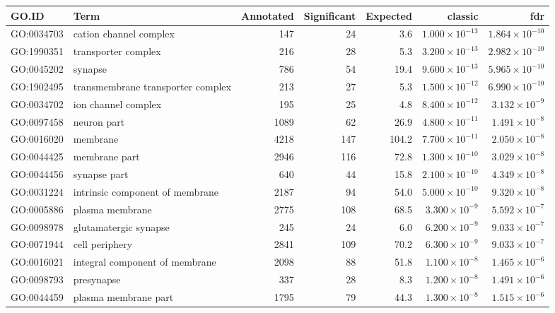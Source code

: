 \begin{table}[ht]
\centering
\begin{tabular}{llrrrrr}
  \hline
GO.ID & Term & Annotated & Significant & Expected & classic & fdr \\ 
  \hline
GO:0034703 & cation channel complex & 147 & 24 & 3.6 & $1.000 \times 10^{-13}$ & $1.864 \times 10^{-10}$ \\ 
  GO:1990351 & transporter complex & 216 & 28 & 5.3 & $3.200 \times 10^{-13}$ & $2.982 \times 10^{-10}$ \\ 
  GO:0045202 & synapse & 786 & 54 & 19.4 & $9.600 \times 10^{-13}$ & $5.965 \times 10^{-10}$ \\ 
  GO:1902495 & transmembrane transporter complex & 213 & 27 & 5.3 & $1.500 \times 10^{-12}$ & $6.990 \times 10^{-10}$ \\ 
  GO:0034702 & ion channel complex & 195 & 25 & 4.8 & $8.400 \times 10^{-12}$ & $3.132 \times 10^{-9}$ \\ 
  GO:0097458 & neuron part & 1089 & 62 & 26.9 & $4.800 \times 10^{-11}$ & $1.491 \times 10^{-8}$ \\ 
  GO:0016020 & membrane & 4218 & 147 & 104.2 & $7.700 \times 10^{-11}$ & $2.050 \times 10^{-8}$ \\ 
  GO:0044425 & membrane part & 2946 & 116 & 72.8 & $1.300 \times 10^{-10}$ & $3.029 \times 10^{-8}$ \\ 
  GO:0044456 & synapse part & 640 & 44 & 15.8 & $2.100 \times 10^{-10}$ & $4.349 \times 10^{-8}$ \\ 
  GO:0031224 & intrinsic component of membrane & 2187 & 94 & 54.0 & $5.000 \times 10^{-10}$ & $9.320 \times 10^{-8}$ \\ 
  GO:0005886 & plasma membrane & 2775 & 108 & 68.5 & $3.300 \times 10^{-9}$ & $5.592 \times 10^{-7}$ \\ 
  GO:0098978 & glutamatergic synapse & 245 & 24 & 6.0 & $6.200 \times 10^{-9}$ & $9.033 \times 10^{-7}$ \\ 
  GO:0071944 & cell periphery & 2841 & 109 & 70.2 & $6.300 \times 10^{-9}$ & $9.033 \times 10^{-7}$ \\ 
  GO:0016021 & integral component of membrane & 2098 & 88 & 51.8 & $1.100 \times 10^{-8}$ & $1.465 \times 10^{-6}$ \\ 
  GO:0098793 & presynapse & 337 & 28 & 8.3 & $1.200 \times 10^{-8}$ & $1.491 \times 10^{-6}$ \\ 
  GO:0044459 & plasma membrane part & 1795 & 79 & 44.3 & $1.300 \times 10^{-8}$ & $1.515 \times 10^{-6}$ \\ 

\end{tabular}
\end{table}
